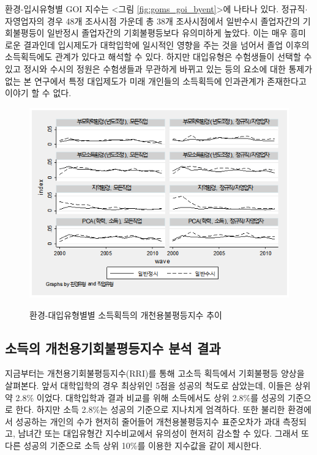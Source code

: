 환경-입시유형별 GOI 지수는 <그림 \ref{fig:goms_goi_byent}>에 나타나 있다.
정규직$\cdot$자영업자의 경우 48개 조사시점 가운데 총 38개 조사시점에서 일반수시 졸업자간의 기회불평등이 일반정시 졸업자간의 기회불평등보다 유의미하게 높았다.
이는 매우 흥미로운 결과인데 입시제도가 대학입학에 일시적인 영향을 주는 것을 넘어서 졸업 이후의 소득획득에도 관계가 있다고 해석할 수 있다.
하지만 대입유형은 수험생들이 선택할 수 있고 정시와 수시의 정원은 수험생들과 무관하게 바뀌고 있는 등의 요소에 대한 통제가 없는 본 연구에서 특정 대입제도가 미래 개인들의 소득획득에 인과관계가 존재한다고 이야기 할 수 없다.

\begin{figure}
    \centering
    \caption{환경-대입유형별별 소득획득의 개천용불평등지수 추이}
    \includegraphics[width=\textwidth]{figure/gomse_goi_byent.png}
    \label{fig:gomse_goi_byent}
\end{figure}

\subsection{소득의 개천용기회불평등지수 분석 결과}
지금부터는 개천용기회불평등지수(RRI)를 통해 고소득 획득에서 기회불평등 양상을 살펴본다.
 앞서 대학입학의 경우 최상위인 5점을 성공의 척도로 삼았는데, 이들은 상위 약 2.8\% 이었다.
 대학입학과 결과 비교를 위해 소득에서도 상위 2.8\%를 성공의 기준으로 한다.
 하지만 소득 2.8\%는 성공의 기준으로 지나치게 엄격하다.
 또한 불리한 환경에서 성공하는 개인의 수가 현저히 줄어들어 개천용불평등지수 표준오차가 과대 측정되고, 남녀간 또는 대입유형간 지수비교에서 유의성이 현저히 감소할 수 있다.
 그래서 또다른 성공의 기준으로 소득 상위 10\%를 이용한 지수값을 같이 제시한다.
 
